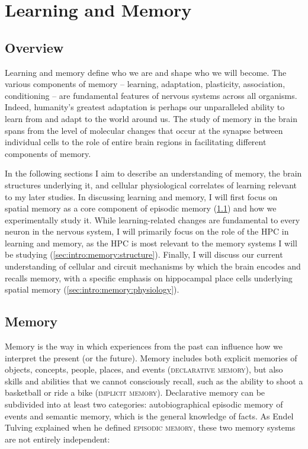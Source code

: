 \acresetall
\chapter{Learning and Memory}
\label{ch:intro:memory}
\section*{Overview}
Learning and memory define who we are and shape who we will become.
The various components of memory -- learning, adaptation, plasticity, association, conditioning -- are fundamental features of nervous systems across all organisms.
Indeed, humanity's greatest adaptation is perhaps our unparalleled ability to learn from and adapt to the world around us.
The study of memory in the brain spans from the level of molecular changes that occur at the synapse between individual cells to the role of entire brain regions in facilitating different components of memory.

In the following sections I aim to describe an understanding of memory, the brain structures underlying it, and cellular physiological correlates of learning relevant to my later studies.
In discussing learning and memory, I will first focus on spatial memory as a core component of episodic memory (\ref{sec:intro:memory:memory}) and how we experimentally study it.
While learning-related changes are fundamental to every neuron in the nervous system, I will primarily focus on the role of the \ac{HPC} in learning and memory, as the \ac{HPC} is most relevant to the memory systems I will be studying (\ref{sec:intro:memory:structure}).
Finally, I will discuss our current understanding of cellular and circuit mechanisms by which the brain encodes and recalls memory, with a specific emphasis on hippocampal place cells underlying spatial memory (\ref{sec:intro:memory:physiology}).

\section{Memory}
\label{sec:intro:memory:memory}
Memory is the way in which experiences from the past can influence how we interpret the present (or the future).
Memory includes both explicit memories of objects, concepts, people, places, and events (\textsc{declarative memory}), but also skills and abilities that we cannot consciously recall, such as the ability to shoot a basketball or ride a bike (\textsc{implicit memory}).
Declarative memory can be subdivided into at least two categories: autobiographical episodic memory of events and semantic memory, which is the general knowledge of facts.
As Endel Tulving explained when he defined \textsc{episodic memory}, these two memory systems are not entirely independent:

